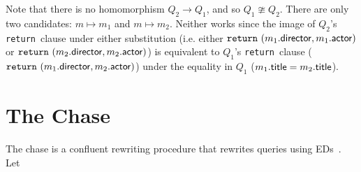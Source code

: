 \documentclass[preprint]{sigplanconf}
\newcommand{\RETURN}{{\tt return}\relax\ifmmode\ \else\xspace\fi}
\begin{document}
Note that there is no homomorphism $Q_2 \to Q_1$, and so $Q_1 \ncong Q_2$.  
There are only two candidates: $m \mapsto m_1$ and $m \mapsto m_2$.  
Neither works since the image of $Q_2$'s \RETURN clause under either substitution (i.e. either $\RETURN (m_1.{\sf director}, m_1.{\sf actor})$ or $\RETURN (m_2.{\sf director}, m_2.{\sf actor})$) is equivalent to $Q_1$'s \RETURN clause ($\RETURN (m_1.{\sf director}, m_2.{\sf actor})$) under the equality in $Q_1$ ($m_1.{\sf title} = m_2.{\sf title}$).

%
%


\section{The Chase}
\label{sec:chase}

The chase is a confluent rewriting procedure that rewrites queries using EDs~\cite{foundations}.   Let
\end{document}
